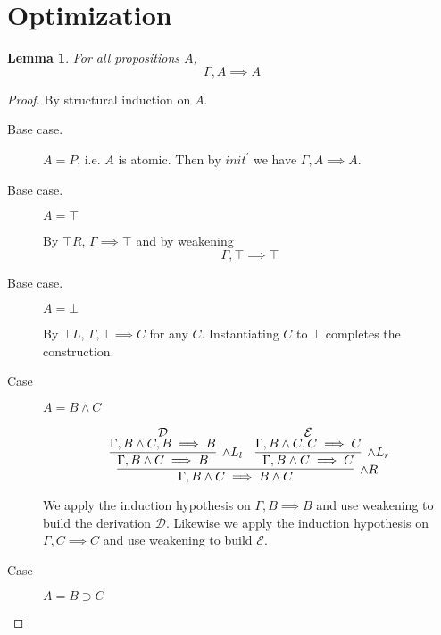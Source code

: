 \documentclass[11pt,letterpaper]{article}
\newtheorem{lemma}{Lemma}
\newcommand{\seq}{\implies}
\newcommand{\imp}{\supset}
\begin{document}
\section{Optimization}

\begin{lemma}
    For all propositions $A$, $$\Gamma, A \seq A$$
\end{lemma}

\begin{proof}
    By structural induction on $A$.

    \begin{description}
        \item[Base case.] $A = P$, i.e. $A$ is atomic. Then by $init^\prime$ we
            have $\Gamma, A \seq A$.

        \item[Base case.] $A = \top$

            By $\top R$, $\Gamma \seq \top$ and by weakening
            \begin{equation*}
                \Gamma, \top \seq \top
            \end{equation*}

        \item[Base case.] $A = \bot$

            By $\bot L$, $\Gamma, \bot \seq C$ for any $C$. Instantiating $C$
            to $\bot$ completes the construction.

        \item[Case] $A = B \land C$

            \begin{equation*}
                \infer[\land R]{\Gamma, B \land C \seq B \land C}{
                    \infer[\land L_l]{\Gamma, B \land C \seq B}{
                        \deduce[\mathcal{D}]{\Gamma, B \land C, B \seq B}{}
                    }
                    &
                    \infer[\land L_r]{\Gamma, B \land C \seq C}{
                        \deduce[\mathcal{E}]{\Gamma, B \land C, C \seq C}{}
                    }
                }
            \end{equation*}

            We apply the induction hypothesis on $\Gamma, B \seq B$ and use
            weakening to build the derivation $\mathcal{D}$. Likewise we apply
            the induction hypothesis on $\Gamma, C \seq C$ and use weakening to
            build $\mathcal{E}$.


        \item[Case] $A = B \imp C$


\end{description}
\end{proof}
\end{document}
